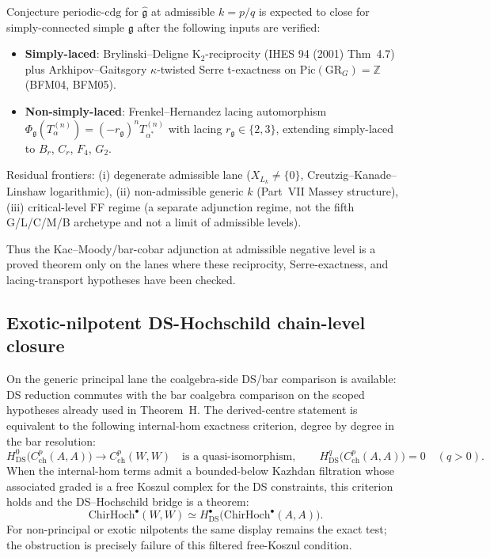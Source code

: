 \documentclass[11pt]{article}
\begin{document}
Conjecture $\mathrm{periodic\text{-}cdg}$ for $\widehat{\mathfrak{g}}$
at admissible $k = p/q$ is expected to close for simply-connected
simple $\mathfrak{g}$ after the following inputs are verified:
\begin{itemize}
\item \textbf{Simply-laced}: Brylinski--Deligne K$_2$-reciprocity
(IHES 94 (2001) Thm~4.7) plus Arkhipov--Gaitsgory
$\kappa$-twisted Serre t-exactness on $\mathrm{Pic}(\mathrm{GR}_G)
= \mathbb{Z}$ (BFM04, BFM05).
\item \textbf{Non-simply-laced}: Frenkel--Hernandez lacing automorphism
$\Phi_{\mathfrak{g}}(T^{(n)}_{\alpha}) = (-r_{\mathfrak{g}})^n
T^{(n)}_{\alpha^*}$ with lacing $r_{\mathfrak{g}} \in \{2, 3\}$, extending
simply-laced to $B_r$, $C_r$, $F_4$, $G_2$.
\end{itemize}
Residual frontiers:
(i) degenerate admissible lane ($X_{L_k} \ne \{0\}$, Creutzig--Kanade--Linshaw
logarithmic),
(ii) non-admissible generic $k$ (Part~VII Massey structure),
(iii) critical-level FF regime (a separate adjunction regime, not
the fifth G/L/C/M/B archetype and not a limit of admissible levels).

Thus the Kac--Moody/bar-cobar adjunction at admissible negative
level is a proved theorem only on the lanes where these
reciprocity, Serre-exactness, and lacing-transport hypotheses have
been checked.

\subsection{Exotic-nilpotent DS-Hochschild chain-level closure}

\begin{theorem}
\label{thm:ds-hochschild-internal-hom-obstruction}
On the generic principal lane the coalgebra-side DS/bar comparison is
available: DS reduction commutes with the bar coalgebra comparison on
the scoped hypotheses already used in Theorem~H.  The derived-centre
statement is equivalent to the following internal-hom exactness
criterion, degree by degree in the bar resolution:
\[
  H^0_{\mathrm{DS}}\!\bigl(C^p_{\mathrm{ch}}(A,A)\bigr)
  \longrightarrow C^p_{\mathrm{ch}}(W,W)
  \quad\text{is a quasi-isomorphism},\qquad
  H^q_{\mathrm{DS}}\!\bigl(C^p_{\mathrm{ch}}(A,A)\bigr)=0
  \quad(q>0).
\]
When the internal-hom terms admit a bounded-below Kazhdan
filtration whose associated graded is a free Koszul complex for
the DS constraints, this criterion holds and the DS--Hochschild
bridge is a theorem:
\[
  \mathrm{ChirHoch}^{\bullet}(W,W)
  \simeq
  H^\bullet_{\mathrm{DS}}
  \bigl(\mathrm{ChirHoch}^{\bullet}(A,A)\bigr).
  \]
For non-principal or exotic nilpotents the same display remains
the exact test; the obstruction is precisely failure of this
filtered free-Koszul condition.
\end{theorem}
\end{document}
